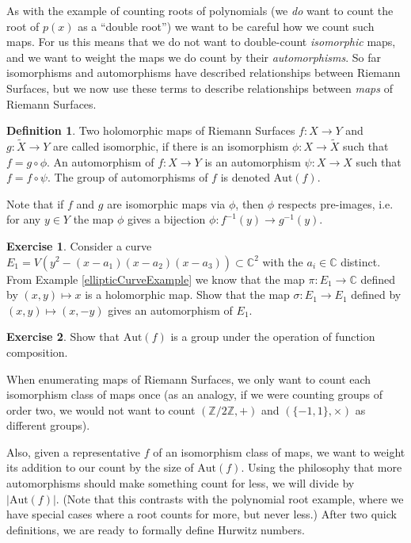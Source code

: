 \documentclass[12pt]{book}%
\theoremstyle{plain}
\theoremstyle{definition}
\newtheorem{definition}[theorem]{Definition}
\newtheorem{exercise}{Exercise}
\theoremstyle{remark}
\def\to{\rightarrow}
\def\bC{{\mathbb{C}}}
\def\bZ{{\mathbb{Z}}}
\begin{document}
As with the example of counting roots of polynomials (we \textit{do} want to count the root of $p(x)$ as a ``double root'') we want to be careful how we count such maps. For us this means that we do not want to double-count \textit{isomorphic} maps, and we want to weight the maps we do count by their \textit{automorphisms}. So far isomorphisms and automorphisms have described relationships between Riemann Surfaces, but we now use these terms to describe relationships between \textit{maps} of Riemann Surfaces. 

\begin{definition}
Two holomorphic maps of Riemann Surfaces $f:X \to Y$ and $g:\tilde{X} \to Y$ are called isomorphic, if there is an isomorphism $\phi:X \to \tilde{X}$ such that $f=g \circ \phi$. An automorphism of $f:X \to Y$ is an automorphism $\psi:X \to X$ such that $f = f \circ \psi$. The group of automorphisms of $f$ is denoted $\text{Aut}(f)$.
\end{definition}

Note that if $f$ and $g$ are isomorphic maps via $\phi$, then $\phi$ respects pre-images, i.e. for any $y\in Y$ the map $\phi$ gives a bijection $\phi:f^{-1}(y) \to g^{-1}(y)$.

\begin{exercise}
\label{involutionOfEllCurve}
Consider a curve $E_1 = V( y^2 - (x-a_1)(x-a_2)(x-a_3)) \subset \bC^2$ with the $a_i \in \bC$ distinct. From Example \ref{ellipticCurveExample} we know that the map $\pi: E_1 \to \bC$ defined by $(x,y) \mapsto x$ is a holomorphic map. Show that the map $\sigma:E_1 \to E_1$ defined by $(x,y) \mapsto (x, -y)$ gives an automorphism of $E_1$.
\end{exercise}

\begin{exercise}
Show that $\text{Aut}(f)$ is a group under the operation of function composition.
\end{exercise}

When enumerating maps of Riemann Surfaces, we only want to count each isomorphism class of maps once (as an analogy, if we were counting groups of order two, we would not want to count $(\bZ/{2\bZ}, +)$ and $(\{-1,1\}, \times)$ as different groups).

Also, given a representative $f$ of an isomorphism class of maps, we want to weight its addition to our count by the size of $\text{Aut}(f)$. Using the philosophy that more automorphisms should make something count for less, we will divide by $|\text{Aut}(f)|$. (Note that this contrasts with the polynomial root example, where we have special cases where a root counts for more, but never less.) After two quick definitions, we are ready to formally define Hurwitz numbers.
\end{document}
